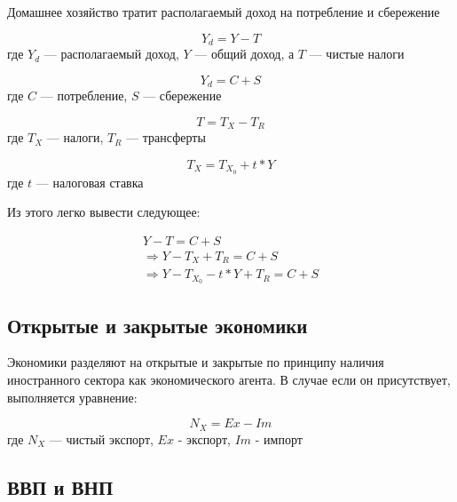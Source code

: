 \documentclass{article}
\begin{document}
Домашнее хозяйство тратит располагаемый доход на потребление и сбережение 

\begin{equation}
    Y_{d} = Y - T
\end{equation}
где $Y_{d}$ --- располагаемый доход, $Y$ --- общий доход, а $T$ --- чистые налоги

\quad

\begin{equation}
    Y_{d} = C + S
\end{equation}
где $C$ --- потребление, $S$ --- сбережение

\quad

\begin{equation}
    T = T_{X} - T_{R}
\end{equation}
где $T_{X}$ --- налоги, $T_{R}$ --- трансферты

\quad

\begin{equation}
    T_{X} = T_{X_{0}} + t * Y
\end{equation}
где $t$ --- налоговая ставка 

\quad

Из этого легко вывести следующее:

\quad

\begin{gather*}
    Y - T = C + S \\
    \Rightarrow Y - T_{X} + T_{R} = C + S \\
    \Rightarrow Y - T_{X_{0}} - t * Y + T_{R} = C + S
\end{gather*}

\subsection{Открытые и закрытые экономики}

Экономики разделяют на открытые и закрытые по принципу наличия иностранного сектора как экономического агента. В случае если он присутствует, выполняется уравнение:

\begin{equation}
    N_{X} = Ex - Im
\end{equation}
где $N_{X}$ --- чистый экспорт, $Ex$ - экспорт, $Im$ - импорт 

\subsection{ВВП и ВНП}
\end{document}
